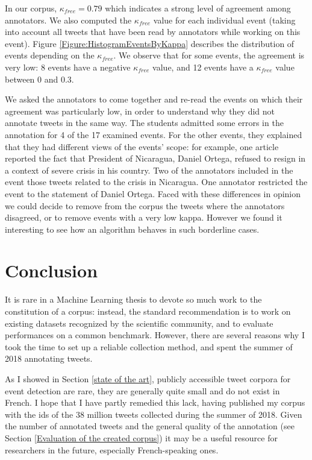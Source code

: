 In our corpus, $\kappa_{free} = 0.79$ which indicates a strong level of agreement among annotators. We also computed the $\kappa_{free}$ value for  each individual event (taking into account all tweets that have been read by annotators while working on this event). Figure \ref{Figure:HistogramEventsByKappa} describes the distribution of events depending on the $\kappa_{free}$. We observe that for some events, the agreement is very low: 8 events have a negative $\kappa_{free}$ value, and 12 events have a $\kappa_{free}$ value between 0 and 0.3.


We asked the annotators to come together and re-read the events on which their agreement was particularly low, in order to understand why they did not annotate tweets in the same way. The students admitted some errors in the annotation for 4 of the 17 examined events. For the other events, they explained that they had different views of the events' scope: for example, one article reported the fact that President of Nicaragua, Daniel Ortega, refused to resign in a context of severe crisis in his country. Two of the annotators included in the event those tweets related to the crisis in Nicaragua. One annotator restricted the event to the statement of Daniel Ortega. Faced with these differences in opinion we could decide to remove from the corpus the tweets where the annotators disagreed, or to remove events with a very low kappa. However we found it interesting to see how an algorithm behaves in such borderline cases.


\section{Conclusion}

It is rare in a Machine Learning thesis to devote so much work to the constitution of a corpus: instead, the standard recommendation is to work on existing datasets recognized by the scientific community, and to evaluate  performances on a common benchmark. However, there are several reasons why I took the time to set up a reliable collection method, and spent the summer of 2018 annotating tweets. 

As I showed in Section \ref{state of the art}, publicly accessible tweet corpora for event detection are rare, they are generally quite small and do not exist in French. I hope that I have partly remedied this lack, having published my corpus with the ids of the 38 million tweets collected during the summer of 2018. Given the number of annotated tweets and the general quality of the annotation (see Section \ref{Evaluation of the created corpus}) it may be a useful resource for researchers in the future, especially French-speaking ones.


